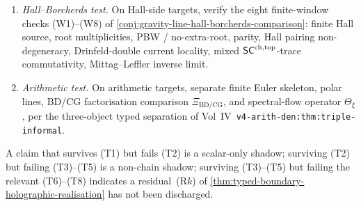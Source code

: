 \begin{definition}
\begin{enumerate}[label=\textup{(T\arabic*)}]
$T = [Q, G]$ at chain level in the stated filtered ambient
$\mathsf{C}_{\rho}$, and verify the five obligations
\textup{(T1)}--\textup{(T5)} of
\cref{thm:topologisation-by-stress-tensor-null-homotopy}: BRST
identity, filtration compatibility, finite-propagation or
weight-completion, SDR-independence of transferred braces,
convolution-anomaly vanishing in $H^{1} / H^{2}$.
\item \emph{Hall--Borcherds test.}  On Hall-side targets, verify
the eight finite-window checks (W1)--(W8) of
\cref{conj:gravity-line-hall-borcherds-comparison}: finite Hall
source, root multiplicities, PBW / no-extra-root, parity, Hall
pairing non-degeneracy, Drinfeld-double current locality, mixed
$\mathsf{SC}^{\mathrm{ch},\mathrm{top}}$-trace commutativity, Mittag--Leffler inverse limit.
\item \emph{Arithmetic test.}  On arithmetic targets, separate
finite Euler skeleton, polar lines, BD/CG factorisation comparison
$\Xi_{\mathrm{BD/CG}}$, and spectral-flow operator $\Theta_{\xi}$,
per the three-object typed separation of
Vol~IV~\texttt{v4-arith-den:thm:triple-informal}.
\end{enumerate}
A claim that survives \textup{(T1)} but fails \textup{(T2)} is a
scalar-only shadow; surviving \textup{(T2)} but failing
\textup{(T3)}--\textup{(T5)} is a non-chain shadow; surviving
\textup{(T3)}--\textup{(T5)} but failing the relevant
\textup{(T6)}--\textup{(T8)} indicates a residual~(R$k$) of
\cref{thm:typed-boundary-holographic-realisation} has not been
discharged.
\end{definition}

